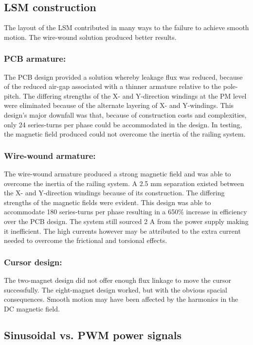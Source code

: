 \documentclass[10pt,twocolumn]{witseiepaper}
\begin{document}
\subsection{LSM construction}

The layout of the LSM contributed in many ways to the failure to achieve
smooth motion.  The wire-wound solution produced better results.

\subsubsection*{PCB armature:} 
The PCB design provided a solution whereby leakage flux was reduced, because
of the reduced air-gap associated with a thinner armature relative to the
pole-pitch.  The differing strengths of the X- and Y-direction windings at the
PM level were eliminated because of the alternate layering of X- and
Y-windings.  This design's major downfall was that, because of construction
costs and complexities, only 24 series-turns per phase could be accommodated
in the design.  In testing, the magnetic field produced could not overcome the
inertia of the railing system.

\subsubsection*{Wire-wound armature:}
The wire-wound armature produced a strong magnetic field and was able to
overcome the inertia of the railing system.  A 2.5 mm separation existed
between the X- and Y-direction windings because of its construction.  The
differing strengths of the magnetic fields were evident.  This design was able
to accommodate 180 series-turns per phase resulting in a 650\% increase in
efficiency over the PCB design.  The system still sourced 2 A from the power
supply making it inefficient.  The high currents however may be attributed to
the extra current needed to overcome the frictional and torsional effects.

\subsubsection*{Cursor design:}
The two-magnet design did not offer enough flux linkage to move the cursor
successfully.  The eight-magnet design worked, but with the obvious spacial
consequences.  Smooth motion may have been affected by the harmonics in the DC
magnetic field.

\subsection{Sinusoidal vs. PWM power signals}
\end{document}
